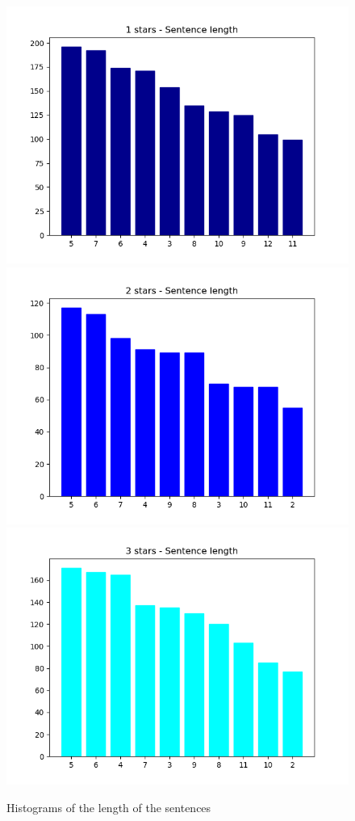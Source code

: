 \begin{figure}[!h]
	\caption{Histograms of the length of the sentences}
	\includegraphics[scale=0.3]{figures/1stars-Sentencelength.png}
	\includegraphics[scale=0.3]{figures/2stars-Sentencelength.png}
	\includegraphics[scale=0.3]{figures/3stars-Sentencelength.png}

\end{figure}
